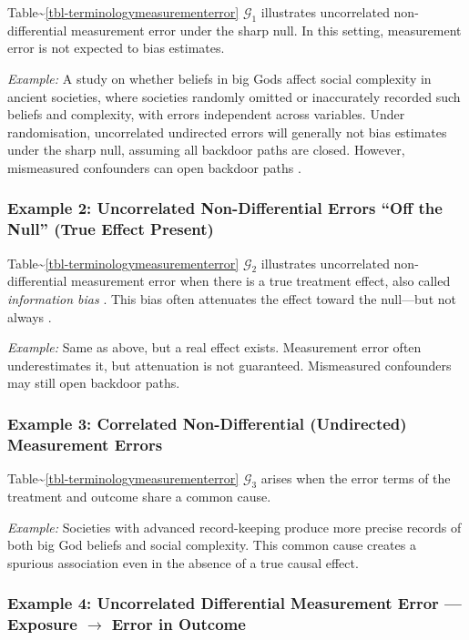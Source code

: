 \documentclass[
  ignorenonframetext,
  aspectratio=169,
]{beamer}
\begin{document}
\begin{frame}
Table\textasciitilde{}\ref{tbl-terminologymeasurementerror}
\(\mathcal{G}_1\) illustrates uncorrelated non-differential measurement
error under the sharp null. In this setting, measurement error is not
expected to bias estimates.

\emph{Example:} A study on whether beliefs in big Gods affect social
complexity in ancient societies, where societies randomly omitted or
inaccurately recorded such beliefs and complexity, with errors
independent across variables. Under randomisation, uncorrelated
undirected errors will generally not bias estimates under the sharp
null, assuming all backdoor paths are closed. However, mismeasured
confounders can open backdoor paths \citep{robins2008estimation}.

\subsubsection*{Example 2: Uncorrelated Non-Differential Errors ``Off the Null'' (True Effect Present)}

Table\textasciitilde{}\ref{tbl-terminologymeasurementerror}
\(\mathcal{G}_2\) illustrates uncorrelated non-differential measurement
error when there is a true treatment effect, also called
\emph{information bias} \citep{lash2009applying}. This bias often
attenuates the effect toward the null---but not always
\citep{jurek2005proper, jurek2006exposure, jurek2008brief}.

\emph{Example:} Same as above, but a real effect exists. Measurement
error often underestimates it, but attenuation is not guaranteed.
Mismeasured confounders may still open backdoor paths.

\subsubsection*{Example 3: Correlated Non-Differential (Undirected) Measurement Errors}

Table\textasciitilde{}\ref{tbl-terminologymeasurementerror}
\(\mathcal{G}_3\) arises when the error terms of the treatment and
outcome share a common cause.

\emph{Example:} Societies with advanced record-keeping produce more
precise records of both big God beliefs and social complexity. This
common cause creates a spurious association even in the absence of a
true causal effect.

\subsubsection*{Example 4: Uncorrelated Differential Measurement Error — Exposure $\rightarrow$ Error in Outcome}


\end{frame}
\end{document}
